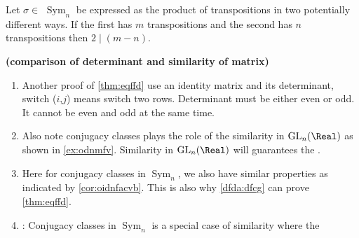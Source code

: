 \documentclass{article}
\newcommand{\bfs}[1]{\textbf{({#1}) }}
\newcommand{\Sym}{\operatorname{Sym}}
\newcommand{\GL}{\operatorname{GL}}
\begin{document}
\begin{thma}\label{thm:eqffd}
Let $\sigma \in$  $\Sym_{n}$ be expressed as the product of transpositions in two potentially different ways. If the first has $m$ transpositions and the second has $n$ transpositions then $2 \mid(m-n)$.
\end{thma}
\begin{rema}\bfs{comparison of determinant and similarity of matrix}
\begin{enumerate}
    \item\label{dfda:dfcg} Another proof of \cref{thm:eqffd} use an identity matrix and its determinant, switch ($i$,$j$) means switch two rows. Determinant must be either even or odd. It cannot be even and odd at the same time.
    \item Also note conjugacy classes plays the role of the similarity in $\GL_n(\Real)$  as shown in \cref{ex:odnmfv}. Similarity in $\GL_n(\Real)$  will guarantees the .
    \item Here for conjugacy classes in $\Sym_n$, we also have similar properties as indicated by \cref{cor:oidnfacvb}. This is also why \cref{dfda:dfcg} can prove \cref{thm:eqffd}. 
    \item {}: Conjugacy classes in $\Sym_n$ is a special case of similarity where the 
\end{enumerate}

\end{rema}
\end{document}
